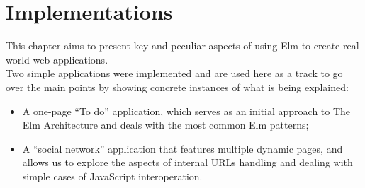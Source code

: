 \chapter{Implementations}

This chapter aims to present key and peculiar aspects of using Elm to create real world web applications.\\
Two simple applications were implemented and are used here as a track to go over the main points by showing concrete instances of what is being explained:
\begin{itemize}
    \item A one-page ``To do'' application, which serves as an initial approach to The Elm Architecture and deals with the most common Elm patterns;
    \item A ``social network'' application that features multiple dynamic pages, and allows us to explore the aspects of internal URLs handling and dealing with simple cases of JavaScript interoperation.
\end{itemize}



